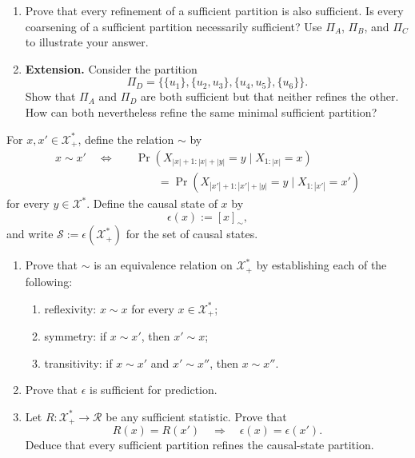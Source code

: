 \documentclass[11pt]{article}
\begin{document}
\begin{exercise}
\begin{enumerate}
    \item Prove that every refinement of a sufficient partition is also
      sufficient. Is every coarsening of a sufficient partition necessarily
      sufficient? Use $\Pi_A$, $\Pi_B$, and $\Pi_C$ to illustrate your answer.

    \item \textbf{Extension.} Consider the partition
      \[
        \Pi_D
          =\bigl\{\{u_1\},\{u_2,u_3\},\{u_4,u_5\},\{u_6\}\bigr\}.
      \]
      Show that $\Pi_A$ and $\Pi_D$ are both sufficient but that neither
      refines the other. How can both nevertheless refine the same minimal
      sufficient partition?
  \end{enumerate}
\end{exercise}

\begin{exercise}
\label{ex:p2-2}
  For $x,x'\in\mathcal X_+^*$, define the relation $\sim$ by
  \[
    \begin{aligned}
    x\sim x'
    \quad\Longleftrightarrow\quad
    &\Pr\!\left(
      X_{|x|+1:|x|+|y|}=y\mid X_{1:|x|}=x
    \right)\\
    &\qquad=
    \Pr\!\left(
      X_{|x'|+1:|x'|+|y|}=y\mid X_{1:|x'|}=x'
    \right)
    \end{aligned}
  \]
  for every $y\in\mathcal X^*$. Define the causal state of $x$ by
  \[
    \epsilon(x):=[x]_{\sim},
  \]
  and write $\mathcal S:=\epsilon(\mathcal X_+^*)$ for the set of
  causal states.

  \begin{enumerate}
    \item Prove that $\sim$ is an equivalence relation on
      $\mathcal X_+^*$ by establishing each of the following:
      \begin{enumerate}
        \item reflexivity: $x\sim x$ for every $x\in\mathcal X_+^*$;
        \item symmetry: if $x\sim x'$, then $x'\sim x$;
        \item transitivity: if $x\sim x'$ and $x'\sim x''$, then
          $x\sim x''$.
      \end{enumerate}

    \item Prove that $\epsilon$ is sufficient for prediction.

    \item Let $R:\mathcal X_+^*\to\mathcal R$ be any sufficient statistic.
      Prove that
      \[
        R(x)=R(x')\quad\Longrightarrow\quad
        \epsilon(x)=\epsilon(x').
      \]
      Deduce that every sufficient partition refines the causal-state
      partition.


\end{enumerate}
\end{exercise}
\end{document}
